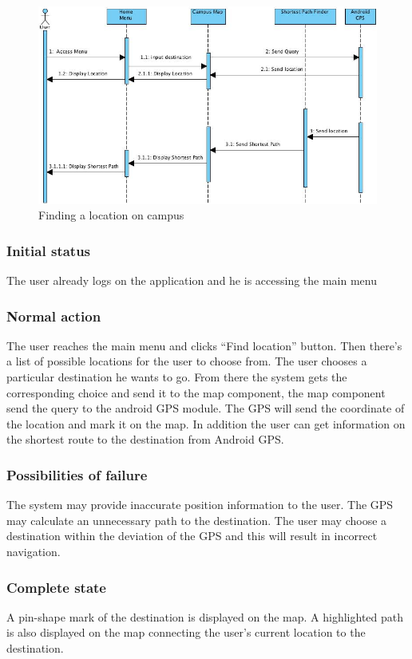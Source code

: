\documentclass[10pt,a4paper,oneside]{report}
\begin{document}
\begin{figure}[H]
 \centering
 \includegraphics[keepaspectratio, scale=0.5]{seqfind.png}
 \caption{Finding a location on campus}
\end{figure}
\subsubsection*{Initial status}
The user already logs on the application and he is accessing the main menu
\subsubsection*{Normal action}
The user reaches the main menu and clicks “Find location” button. Then there’s a list of possible locations for the user to choose from. The user chooses a particular destination he wants to go. From there the system gets the corresponding choice and send it to the map component, the map component send the query to the android GPS module. The GPS will send the coordinate of the location and mark it on the map. In addition the user can get information on the shortest route to the destination from Android GPS.
\subsubsection*{Possibilities of failure}
The system may provide inaccurate position information to the user. The GPS may calculate an unnecessary path to the destination. The user may choose a destination within the deviation of the GPS and this will result in incorrect navigation.
\subsubsection*{Complete state}
A pin-shape mark of the destination is displayed on the map. A highlighted path is also displayed on the map connecting the user’s current location to the destination.
\end{document}
